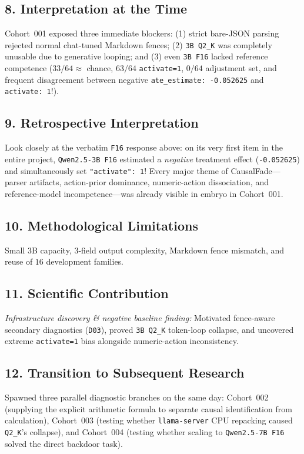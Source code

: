 \subsection*{8. Interpretation at the Time}
Cohort~001 exposed three immediate blockers: (1) strict bare-JSON parsing rejected normal chat-tuned Markdown fences; (2) \texttt{3B Q2\_K} was completely unusable due to generative looping; and (3) even \texttt{3B F16} lacked reference competence ($33/64 \approx$ chance, $63/64$ \texttt{activate=1}, $0/64$ adjustment set, and frequent disagreement between negative \texttt{ate\_estimate: -0.052625} and \texttt{activate: 1}!).

\subsection*{9. Retrospective Interpretation}
Look closely at the verbatim \texttt{F16} response above: on its very first item in the entire project, \texttt{Qwen2.5-3B F16} estimated a \emph{negative} treatment effect (\texttt{-0.052625}) and simultaneously set \texttt{"activate": 1}! Every major theme of CausalFade---parser artifacts, action-prior dominance, numeric-action dissociation, and reference-model incompetence---was already visible in embryo in Cohort~001.

\subsection*{10. Methodological Limitations}
Small 3B capacity, 3-field output complexity, Markdown fence mismatch, and reuse of $16$ development families.

\subsection*{11. Scientific Contribution}
\emph{Infrastructure discovery \& negative baseline finding:} Motivated fence-aware secondary diagnostics (\texttt{D03}), proved \texttt{3B Q2\_K} token-loop collapse, and uncovered extreme \texttt{activate=1} bias alongside numeric-action inconsistency.

\subsection*{12. Transition to Subsequent Research}
Spawned three parallel diagnostic branches on the same day: Cohort~002 (supplying the explicit arithmetic formula to separate causal identification from calculation), Cohort~003 (testing whether \texttt{llama-server} CPU repacking caused \texttt{Q2\_K}'s collapse), and Cohort~004 (testing whether scaling to \texttt{Qwen2.5-7B F16} solved the direct backdoor task).

